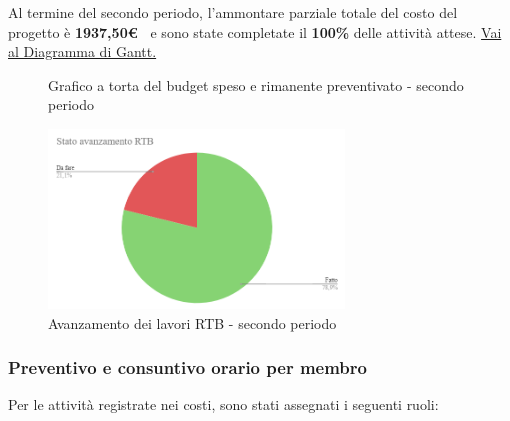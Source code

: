 Al termine del secondo periodo, l'ammontare parziale totale del costo del progetto è \textbf{ 1937,50\euro\ } e sono state completate il \textbf{100\%} delle attività attese.
\href{https://github.com/orgs/ByteOps-swe/projects/3/views/1?sortedBy%5Bdirection%5D=asc&sortedBy%5BcolumnId%5D=64182560}{Vai al Diagramma di Gantt.}


\begin{figure}[H]
    \centering
    \begin{minipage}[b]{0.45\textwidth}
        \centering
        \caption{Grafico a torta del budget speso e rimanente preventivato - secondo periodo}
        \label{fig:Budget_speso_2}
    \end{minipage}
    
    \vspace{1cm}

    \begin{minipage}[b]{0.70\textwidth}
        \centering
        \includegraphics[width=0.7\textwidth]{../Images/avanzamento2Periodo.png}
        \caption{Avanzamento dei lavori RTB - secondo periodo}
        \label{fig:Avanzamento_RTB_2}
    \end{minipage}
\end{figure}

\subsubsection*{Preventivo e consuntivo orario per membro}
Per le attività registrate nei costi, sono stati assegnati i seguenti ruoli:

